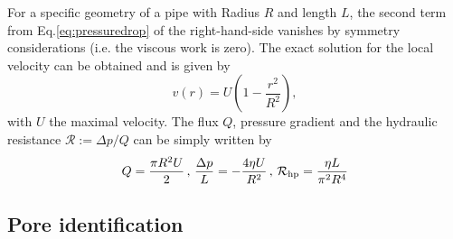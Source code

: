 \documentclass[draft]{agujournal2019}
\begin{document}
For a specific geometry of a pipe with Radius $R$ and length $L$, the second term from Eq.\ref{eq:pressuredrop} of the right-hand-side vanishes by symmetry considerations (i.e. the viscous work is zero). The exact solution for the local velocity can be obtained and is given by 
\begin{equation}\label{eq:poiseuille}
v(r)=U \left(1-\frac{r^2}{R^2}\right),
\end{equation}
with $U$ the maximal velocity. The flux $Q$, pressure gradient and the hydraulic resistance $\mathcal{R}:=\Delta p/Q$ can be simply written by
\begin{equation}
	Q=\frac{\pi R^2 U}{2}\,,\,\frac{\Delta p}{L}=-\frac{4\eta U}{R^2}\, , \, \mathcal{R}_{\rm{hp}}= \frac{\eta L}{\pi^2 R^4}
\end{equation}


\subsection{Pore identification}
\end{document}
